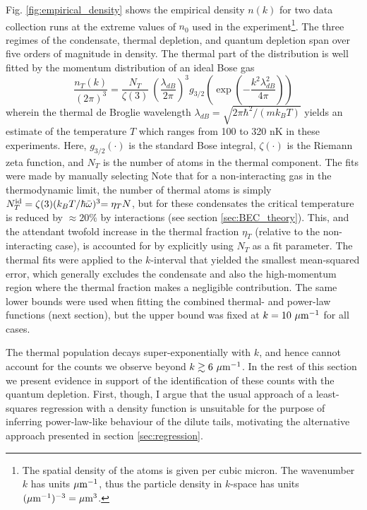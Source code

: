 	Fig. \ref{fig:empirical_density} shows the empirical density $n(k)$ for two data collection runs at the extreme values of $n_0$ used in the experiment\footnote{The spatial density of the atoms is given per cubic micron. The wavenumber $k$ has units $\mu\textrm{m}^{-1}$, thus the particle density in $k$-space has units $(\mu\textrm{m}^{-1})^{-3}=\mu\textrm{m}^{3}$.}. The three regimes of the condensate, thermal depletion, and quantum depletion span over five orders of magnitude in density. The thermal part of the distribution is well fitted by the momentum distribution of an ideal Bose gas \cite{Dalfovo99}
	\begin{equation}
		\frac{n_T(k)}{{(2\pi)^3}} =\frac{N_T}{\zeta(3)} ~\left(\frac{\lambda_{dB}}{2\pi}\right)^3 g_{3/2}\left(\exp\left(-\frac{k^2 \lambda_{dB}^2}{4\pi}\right)\right)
		\label{eqn:th_fun}
	\end{equation}
	wherein the thermal de Broglie wavelength $\lambda_{dB} = \sqrt{2\pi\hbar^2/(m k_B T)}$ yields an estimate of the temperature $T$ which ranges from 100 to 320 nK in these experiments. Here, $g_{3/2}(\cdot)$ is the standard Bose integral, $\zeta(\cdot)$ is the Riemann zeta function, and $N_T$ is the number of atoms in the thermal component. The fits were made by manually selecting 
	Note that for a non-interacting gas in the thermodynamic limit, the {number of thermal atoms} %
	is simply ${N_T^{\rm id}} = \zeta(3)(k_B T / \hbar\bar{\omega})^3{=\eta_T N}$, but for these condensates the critical temperature is reduced by $\approx20\%$ by interactions (see section \ref{sec:BEC_theory}).
	This, and the attendant twofold increase in the thermal fraction {$\eta_T$}  (relative to the non-interacting case), is accounted for by explicitly using $N_T$ as a fit parameter. 
	The thermal fits were applied to the $k$-interval that yielded the smallest mean-squared error, which generally excludes the condensate and also the high-momentum region where the thermal fraction makes a negligible contribution.
	The same lower bounds were used when fitting the combined thermal- and power-law functions (next section), but the upper bound was fixed at $k=10~\mu\textrm{m}^{-1}$ for all cases.


	The thermal population decays super-exponentially with $k$, and hence cannot account for the counts we observe beyond $k\gtrsim 6~\mu\textrm{m}^{-1}$. 
	In the rest of this section we present evidence in support of the identification of these counts with the quantum depletion. 
	First, though, I argue that the usual approach of a least-squares regression with a density function is unsuitable for the purpose of inferring power-law-like behaviour of the dilute tails, motivating the alternative approach presented in section \ref{sec:regression}.

